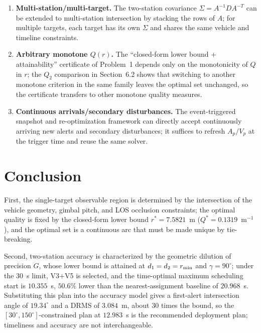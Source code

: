 \begin{enumerate}[label=(\arabic*)]
\item \textbf{Multi-station/multi-target.} The two-station covariance $\Sigma=A^{-1}DA^{-T}$ can be extended to multi-station intersection by stacking the rows of $A$; for multiple targets, each target has its own $\Sigma$ and shares the same vehicle and timeline constraints.

\item \textbf{Arbitrary monotone $Q(r)$.} The ``closed-form lower bound + attainability'' certificate of Problem~1 depends only on the monotonicity of $Q$ in $r$; the $Q_2$ comparison in Section~6.2 shows that switching to another monotone criterion in the same family leaves the optimal set unchanged, so the certificate transfers to other monotone quality measures.

\item \textbf{Continuous arrivals/secondary disturbances.} The event-triggered snapshot and re-optimization framework can directly accept continuously arriving new alerts and secondary disturbances; it suffices to refresh $A_p/V_p$ at the trigger time and reuse the same solver.
\end{enumerate}

\section{Conclusion}
\label{sec:conclusion}

First, the single-target observable region is determined by the intersection of the vehicle geometry, gimbal pitch, and LOS occlusion constraints; the optimal quality is fixed by the closed-form lower bound $r^*=7.5821$~m ($Q^*=0.1319$~m$^{-1}$), and the optimal set is a continuous arc that must be made unique by tie-breaking.

Second, two-station accuracy is characterized by the geometric dilution of precision $G$, whose lower bound is attained at $d_1=d_2=r_{\min}$ and $\gamma=90^\circ$; under the 30~s limit, V3+V5 is selected, and the time-optimal maximum scheduling start is $10.355$~s, $50.6\%$ lower than the nearest-assignment baseline of $20.968$~s. Substituting this plan into the accuracy model gives a first-alert intersection angle of $19.34^\circ$ and a DRMS of $3.084$~m, about $30$ times the bound, so the $[30^\circ,150^\circ]$-constrained plan at $12.983$~s is the recommended deployment plan; timeliness and accuracy are not interchangeable.

